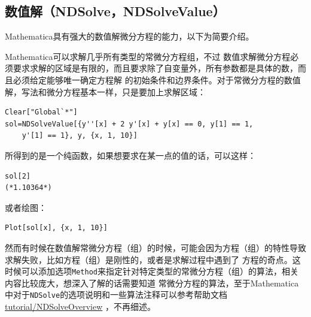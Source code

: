 \documentclass[UTF8,a4paper,10pt]{ctexart}
\newcommand{\mma}{Mathematica}
\begin{document}
\subsection{数值解（NDSolve，NDSolveValue）}

\mma 具有强大的数值解微分方程的能力，以下为简要介绍。

Mathematica可以求解几乎所有类型的常微分方程组，不过
数值求解微分方程必须要求求解的区域是有限的，而且要求除了自变量外，所有参数都是具体的数，而且必须给定能够唯一确定方程解
的初始条件和边界条件。对于常微分方程的数值解，写法和微分方程基本一样，只是要加上求解区域：



\begin{lstlisting}
Clear["Global`*"]
sol=NDSolveValue[{y''[x] + 2 y'[x] + y[x] == 0, y[1] == 1,
    y'[1] == 1}, y, {x, 1, 10}]
\end{lstlisting}
所得到的是一个纯函数，如果想要求在某一点的值的话，可以这样：


\begin{lstlisting}
sol[2]
(*1.10364*)
\end{lstlisting}
或者绘图：

\begin{lstlisting}
Plot[sol[x], {x, 1, 10}]
\end{lstlisting}

然而有时候在数值解常微分方程（组）的时候，可能会因为方程（组）的特性导致求解失败，比如方程（组）是刚性的，或者是求解过程中遇到了
方程的奇点。这时候可以添加选项\verb|Method|来指定针对特定类型的常微分方程（组）的算法，相关内容比较庞大，想深入了解的话需要知道
常微分方程的算法，至于\mma 中对于\verb|NDSolve|的选项说明和一些算法注释可以参考帮助文档
\href{http://reference.wolfram.com/language/tutorial/NDSolveOverview.html}{tutorial/NDSolveOverview}
，不再细述。
\end{document}
